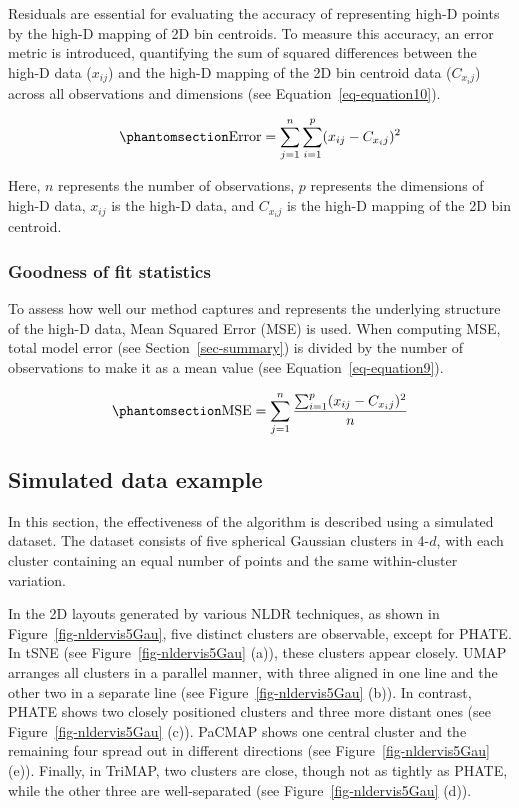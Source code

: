 \documentclass[
  12pt]{article}
\begin{document}
Residuals are essential for evaluating the accuracy of representing
high-D points by the high-D mapping of 2D bin centroids. To measure this
accuracy, an error metric is introduced, quantifying the sum of squared
differences between the high-D data (\(x_{ij}\)) and the high-D mapping
of the 2D bin centroid data (\(C_{x_ij}\)) across all observations and
dimensions (see Equation~\ref{eq-equation10}).

\begin{equation}\phantomsection\label{eq-equation10}{
\text{Error} = \sum_{j = 1}^{n}\sum_{i = 1}^{p} (x_{ij} - C_{x_ij})^2
}\end{equation}

Here, \(n\) represents the number of observations, \(p\) represents the
dimensions of high-D data, \(x_{ij}\) is the high-D data, and
\(C_{x_ij}\) is the high-D mapping of the 2D bin centroid.

\subsubsection{Goodness of fit statistics}\label{sec-goodfit}

To assess how well our method captures and represents the underlying
structure of the high-D data, Mean Squared Error (MSE) is used. When
computing MSE, total model error (see Section~\ref{sec-summary}) is
divided by the number of observations to make it as a mean value (see
Equation~\ref{eq-equation9}).

\begin{equation}\phantomsection\label{eq-equation9}{
\text{MSE} = \sum_{j = 1}^{n} \frac{\sum_{i = 1}^{p} (x_{ij} - C_{x_ij})^2}{n}
}\end{equation}

\subsection{Simulated data example}\label{sec-simpleex}

In this section, the effectiveness of the algorithm is described using a
simulated dataset. The dataset consists of five spherical Gaussian
clusters in 4-\(d\), with each cluster containing an equal number of
points and the same within-cluster variation.

In the 2D layouts generated by various NLDR techniques, as shown in
Figure~\ref{fig-nldervis5Gau}, five distinct clusters are observable,
except for PHATE. In tSNE (see Figure~\ref{fig-nldervis5Gau} (a)), these
clusters appear closely. UMAP arranges all clusters in a parallel
manner, with three aligned in one line and the other two in a separate
line (see Figure~\ref{fig-nldervis5Gau} (b)). In contrast, PHATE shows
two closely positioned clusters and three more distant ones (see
Figure~\ref{fig-nldervis5Gau} (c)). PaCMAP shows one central cluster and
the remaining four spread out in different directions (see
Figure~\ref{fig-nldervis5Gau} (e)). Finally, in TriMAP, two clusters are
close, though not as tightly as PHATE, while the other three are
well-separated (see Figure~\ref{fig-nldervis5Gau} (d)).
\end{document}

